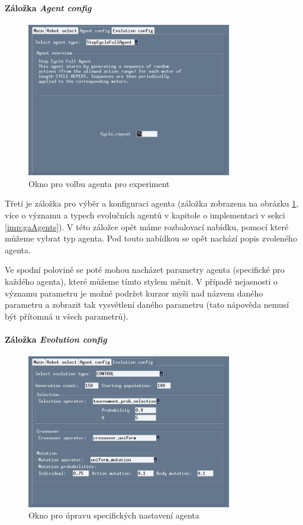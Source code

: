 \paragraph{Záložka \emph{Agent config}}
\begin{figure}[!htb]
    \centering
    \includegraphics[width=0.8\textwidth]{../img/GUI_agent_tab.jpg}
    \caption{Okno pro volbu agenta pro experiment}
    \label{doc_12_fig:GUI_agent}
\end{figure}
Třetí je záložka pro výběr a konfiguraci agenta (záložka zobrazena na obrázku
\ref{doc_12_fig:GUI_agent}, více o významu a typech evolučních agentů v
kapitole o implementaci v sekci \ref{imp:gaAgents}). V této záložce opět máme
rozbalovací nabídku, pomocí které můžeme vybrat typ agenta. Pod touto nabídkou
se opět nachází popis zvoleného agenta. 

Ve spodní polovině se poté mohou nacházet parametry agenta (specifické pro
každého agenta), které můžeme tímto stylem měnit. V případě nejasnosti o
významu parametru je možné podržet kurzor myši nad názvem daného parametru a
zobrazit tak vysvětlení daného parametru (tato nápověda nemusí být přítomná u
všech parametrů).

\paragraph{Záložka \emph{Evolution config}}
\begin{figure}[!htb]
    \centering
    \includegraphics[width=0.8\textwidth]{../img/GUI_evo_tab.jpg}
    \caption{Okno pro úpravu specifických nastavení agenta}
    \label{doc_12_fig:GUI_evo}
\end{figure}

